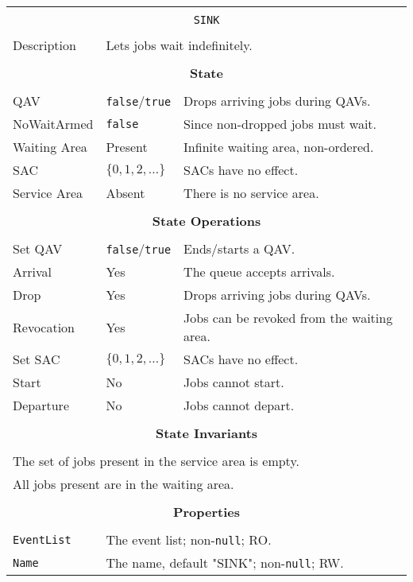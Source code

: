 \documentclass[12pt]{book}
\begin{document}
\begin{tabular}{|l|l|l|}
\hline
\multicolumn{3}{|c|}{} \\
\multicolumn{3}{|c|}{\lstinline[basicstyle=\large]{SINK}} \\
\multicolumn{3}{|c|}{} \\
\hline
Description & \multicolumn{2}{|l|}{Lets jobs wait indefinitely.} \\
\hline
\multicolumn{3}{|c|}{} \\
\multicolumn{3}{|c|}{\bf State} \\
\multicolumn{3}{|c|}{} \\
\hline
QAV & \lstinline|false|/\lstinline|true| & Drops arriving jobs during QAVs. \\
\hline
NoWaitArmed & \lstinline|false| & Since non-dropped jobs must wait. \\
\hline
Waiting Area & Present & Infinite waiting area, non-ordered. \\
\hline
SAC & $\{0, 1, 2, \ldots\}$ & SACs have no effect. \\
\hline
Service Area & Absent & There is no service area. \\
\hline
\multicolumn{3}{|c|}{} \\
\multicolumn{3}{|c|}{\bf State Operations} \\
\multicolumn{3}{|c|}{} \\
\hline
Set QAV & \lstinline|false|/\lstinline|true| & Ends/starts a QAV. \\
\hline
Arrival & Yes & The queue accepts arrivals. \\
\hline
Drop & Yes & Drops arriving jobs during QAVs. \\
\hline
Revocation & Yes & Jobs can be revoked from the waiting area. \\
\hline
Set SAC & $\{0, 1, 2, \ldots\}$ & SACs have no effect. \\
\hline
Start & No & Jobs cannot start. \\
\hline
Departure & No & Jobs cannot depart. \\
\hline
\multicolumn{3}{|c|}{} \\
\multicolumn{3}{|c|}{\bf State  Invariants} \\
\multicolumn{3}{|c|}{} \\
\hline
\multicolumn{3}{|l|}{The set of jobs present in the service area is empty.} \\
\multicolumn{3}{|l|}{All jobs present are in the waiting area.} \\
\hline
\multicolumn{3}{|c|}{} \\
\multicolumn{3}{|c|}{\bf Properties} \\
\multicolumn{3}{|c|}{} \\
\hline
\lstinline|EventList| & \multicolumn{2}{|l|}{The event list; non-\lstinline|null|; RO.} \\
\hline
\lstinline|Name|      & \multicolumn{2}{|l|}{The name, default "SINK"; non-\lstinline|null|; RW.} \\
\hline
\end{tabular}
\end{document}
